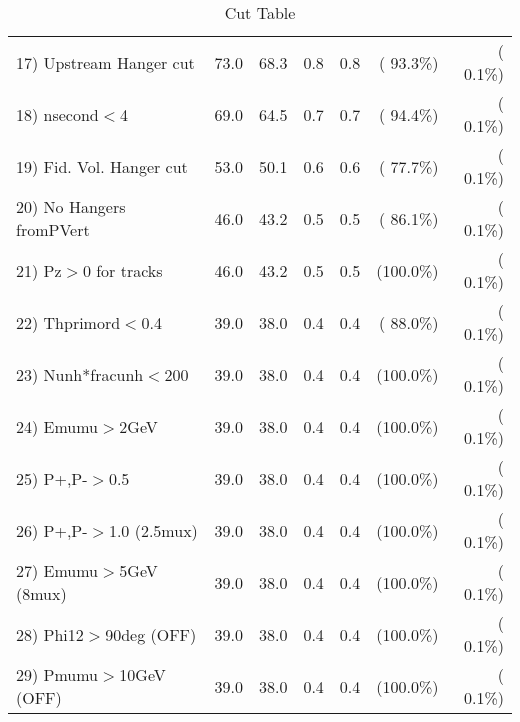 \begin{table}[h!]
\begin{tabular}{||l||r|r|r|r|r|r||}
 17) Upstream Hanger cut  &         73.0 &         68.3 &          0.8 &          0.8 & ( 93.3\%) & (  0.1\%) \\
 18) nsecond$<$4          &         69.0 &         64.5 &          0.7 &          0.7 & ( 94.4\%) & (  0.1\%) \\
 19) Fid. Vol. Hanger cut &         53.0 &         50.1 &          0.6 &          0.6 & ( 77.7\%) & (  0.1\%) \\
 20) No Hangers fromPVert &         46.0 &         43.2 &          0.5 &          0.5 & ( 86.1\%) & (  0.1\%) \\
 21) Pz$>$0 for tracks    &         46.0 &         43.2 &          0.5 &          0.5 & (100.0\%) & (  0.1\%) \\
 22) Thprimord$<$0.4      &         39.0 &         38.0 &          0.4 &          0.4 & ( 88.0\%) & (  0.1\%) \\
 23) Nunh*fracunh$<$200   &         39.0 &         38.0 &          0.4 &          0.4 & (100.0\%) & (  0.1\%) \\
 24) Emumu$>$2GeV         &         39.0 &         38.0 &          0.4 &          0.4 & (100.0\%) & (  0.1\%) \\
 25) P+,P-$>$0.5          &         39.0 &         38.0 &          0.4 &          0.4 & (100.0\%) & (  0.1\%) \\
 26) P+,P-$>$1.0 (2.5mux) &         39.0 &         38.0 &          0.4 &          0.4 & (100.0\%) & (  0.1\%) \\
 27) Emumu$>$5GeV  (8mux) &         39.0 &         38.0 &          0.4 &          0.4 & (100.0\%) & (  0.1\%) \\
 28) Phi12$>$90deg  (OFF) &         39.0 &         38.0 &          0.4 &          0.4 & (100.0\%) & (  0.1\%) \\
 29) Pmumu$>$10GeV  (OFF) &         39.0 &         38.0 &          0.4 &          0.4 & (100.0\%) & (  0.1\%) \\
 \hline
 \hline
 \end{tabular}
 \caption{Cut Table           }
 \label{tab-cutcohjpsi-mumu_anuecc}
 \end{table}
